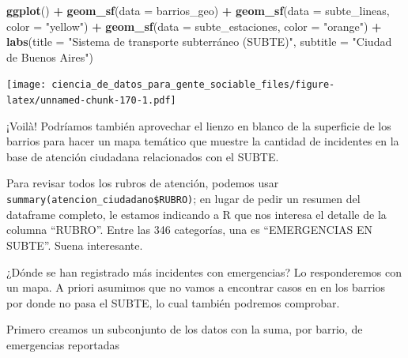 \documentclass[]{book}
\newenvironment{Shaded}{\begin{snugshade}}{\end{snugshade}}
\newcommand{\KeywordTok}[1]{\textcolor[rgb]{0.13,0.29,0.53}{\textbf{#1}}}
\newcommand{\DataTypeTok}[1]{\textcolor[rgb]{0.13,0.29,0.53}{#1}}
\newcommand{\StringTok}[1]{\textcolor[rgb]{0.31,0.60,0.02}{#1}}
\newcommand{\OperatorTok}[1]{\textcolor[rgb]{0.81,0.36,0.00}{\textbf{#1}}}
\newcommand{\NormalTok}[1]{#1}
\begin{document}
\begin{Shaded}
\begin{Highlighting}[]
\KeywordTok{ggplot}\NormalTok{() }\OperatorTok{+}
\StringTok{    }\KeywordTok{geom_sf}\NormalTok{(}\DataTypeTok{data =}\NormalTok{ barrios_geo) }\OperatorTok{+}
\StringTok{    }\KeywordTok{geom_sf}\NormalTok{(}\DataTypeTok{data =}\NormalTok{ subte_lineas, }\DataTypeTok{color =} \StringTok{"yellow"}\NormalTok{) }\OperatorTok{+}
\StringTok{    }\KeywordTok{geom_sf}\NormalTok{(}\DataTypeTok{data =}\NormalTok{ subte_estaciones, }\DataTypeTok{color =} \StringTok{"orange"}\NormalTok{) }\OperatorTok{+}
\StringTok{    }\KeywordTok{labs}\NormalTok{(}\DataTypeTok{title =} \StringTok{"Sistema de transporte subterráneo (SUBTE)"}\NormalTok{,}
         \DataTypeTok{subtitle =} \StringTok{"Ciudad de Buenos Aires"}\NormalTok{)}
\end{Highlighting}
\end{Shaded}

\texttt{[image: ciencia\_de\_datos\_para\_gente\_sociable\_files/figure-latex/unnamed-chunk-170-1.pdf]}

¡Voilà! Podríamos también aprovechar el lienzo en blanco de la
superficie de los barrios para hacer un mapa temático que muestre la
cantidad de incidentes en la base de atención ciudadana relacionados con
el SUBTE.

Para revisar todos los rubros de atención, podemos usar
\texttt{summary(atencion\_ciudadano\$RUBRO)}; en lugar de pedir un
resumen del dataframe completo, le estamos indicando a R que nos
interesa el detalle de la columna ``RUBRO''. Entre las 346 categorías,
una es ``EMERGENCIAS EN SUBTE''. Suena interesante.

¿Dónde se han registrado más incidentes con emergencias? Lo
responderemos con un mapa. A priori asumimos que no vamos a encontrar
casos en en los barrios por donde no pasa el SUBTE, lo cual también
podremos comprobar.

Primero creamos un subconjunto de los datos con la suma, por barrio, de
emergencias reportadas

\begin{Shaded}
\end{Shaded}
\end{document}
